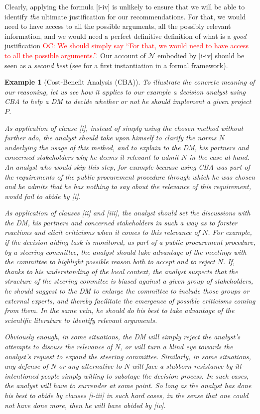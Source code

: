 \documentclass[preprint, french, english, 11pt, authoryear]{elsarticle}%
\newtheorem{example}{Example}
\newcommand{\commentOC}[1]{\textcolor{red}{OC: #1}}
\newcommand{\adv}{\mathscr{N}}
\begin{document}
Clearly, applying the formula [i-iv] is unlikely to ensure that we will be able to identify \emph{the} ultimate justification for our recommendations. For that, we would need to have access to all the possible arguments, all the possibly relevant information, and we would need a perfect definitive definition of what is a \emph{good} justification \commentOC{We should simply say “For that, we would need to have access to all the possible arguments.”}. Our account of $\adv$ embodied by [i-iv] should be seen as a \emph{second best} (see \cite{cailloux_formal_2018} for a first instantiation in a formal framework).

\begin{example}[Cost-Benefit Analysis (CBA)]
To illustrate the concrete meaning of our reasoning, let us see how it applies to our example a decision analyst using CBA to help a \ac{DM} to decide whether or not he should implement a given project $P$.

As application of clause [i], instead of simply using the chosen method without further ado, the analyst should take upon himself to clarify the norms $N$ underlying the usage of this method, and to explain to the \ac{DM}, his partners and concerned stakeholders why he deems it relevant to admit $N$ in the case at hand. An analyst who would skip this step, for example because using CBA was part of the requirements of the public procurement procedure through which he was chosen and he admits that he has nothing to say about the relevance of this requirement, would fail to abide by [i].

As application of clauses [ii] and [iii], the analyst should set the discussions with the \ac{DM}, his partners and concerned stakeholders in such a way as to forster reactions and elicit criticisms when it comes to this relevance of $N$. For example, if the decision aiding task is monitored, as part of a public procurement procedure, by a steering committee, the analyst should take advantage of the meetings with the committee to highlight possible reason both to accept and to reject $N$. If, thanks to his understanding of the local context, the analyst suspects that the structure of the steering commitee is biased against a given group of stakeholders, he should suggest to the \ac{DM} to enlarge the committee to include those groups or external experts, and thereby facilitate the emergence of possible criticisms coming from them. In the same vein, he should do his best to take advantage of the scientific literature to identify relevant arguments.  

Obviously enough, in some situations, the \ac{DM} will simply reject the analyst's attempts to discuss the relevance of $N$, or will turn a blind eye towards the analyst's request to expand the steering committee. Similarly, in some situations, any defense of $N$ or any alternative to $N$ will face a stubborn resistance by ill-intentioned people simply willing to sabotage the decision process. In such cases, the analyst will have to surrender at some point. So long as the analyst has done his best to abide by clauses [i-iii] in such hard cases, in the sense that one could not have done more, then he will have abided by [iv].  
\end{example}
\end{document}
